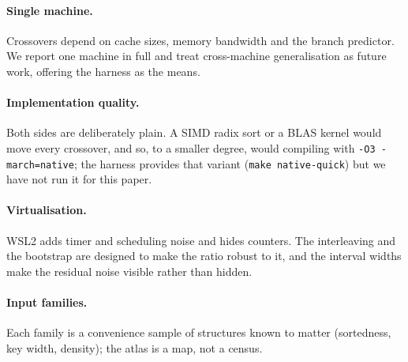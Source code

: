 \paragraph{Single machine.} Crossovers depend on cache sizes, memory bandwidth
and the branch predictor. We report one machine in full and treat
cross-machine generalisation as future work, offering the harness as the means.
\paragraph{Implementation quality.} Both sides are deliberately plain. A SIMD
radix sort or a BLAS kernel would move every crossover, and so, to a smaller
degree, would compiling with \texttt{-O3 -march=native}; the harness provides
that variant (\texttt{make native-quick}) but we have not run it for this
paper.
\paragraph{Virtualisation.} WSL2 adds timer and scheduling noise and hides
counters. The interleaving and the bootstrap are designed to make the ratio
robust to it, and the interval widths make the residual noise visible rather
than hidden.
\paragraph{Input families.} Each family is a convenience sample of structures
known to matter (sortedness, key width, density); the atlas is a map, not a
census.
